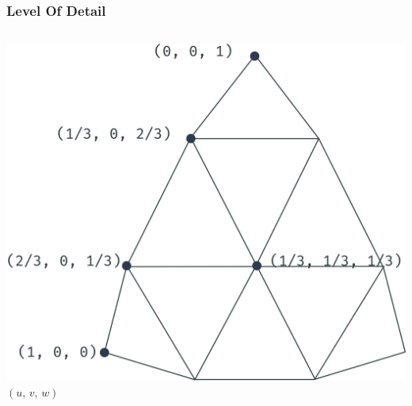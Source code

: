 




\begin{frame}\frametitle{Level Of Detail}
\begin{columns}
		\begin{column}[b]{0.6\textwidth}
			\begin{center}
				\includegraphics[width=\textwidth]{./img/1_single/lodExpanation.png}
				\small{$(u,\, v,\, w)$}
			\end{center}	
		\end{column}
	\end{columns}
\end{frame}

